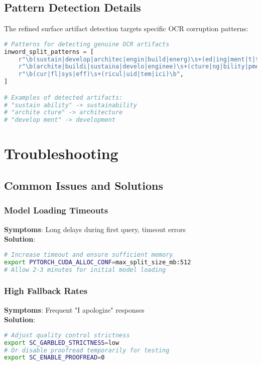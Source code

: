 \documentclass[12pt,a4paper]{article}
\begin{document}
\subsection{Pattern Detection Details}
The refined surface artifact detection targets specific OCR corruption patterns:

\begin{lstlisting}[language=python, caption=Surface artifact patterns]
# Patterns for detecting genuine OCR artifacts
inword_split_patterns = [
    r"\b(sustain|develop|architec|engin|build|energ)\s+(ed|ing|ment|t|ture|al|er|y)\b",
    r"\b(archite|buildi|sustaina|develo|enginee)\s+(cture|ng|bility|pment|ring)\b", 
    r"\b(cur|fl|sys|eff)\s+(ricul|uid|tem|ici)\b",
]

# Examples of detected artifacts:
# "sustain ability" -> sustainability
# "archite cture" -> architecture  
# "develop ment" -> development
\end{lstlisting}

\section{Troubleshooting}

\subsection{Common Issues and Solutions}

\subsubsection{Model Loading Timeouts}
\textbf{Symptoms}: Long delays during first query, timeout errors \\
\textbf{Solution}: 
\begin{lstlisting}[language=bash]
# Increase timeout and ensure sufficient memory
export PYTORCH_CUDA_ALLOC_CONF=max_split_size_mb:512
# Allow 2-3 minutes for initial model loading
\end{lstlisting}

\subsubsection{High Fallback Rates}
\textbf{Symptoms}: Frequent "I apologize" responses \\
\textbf{Solution}:
\begin{lstlisting}[language=bash]
# Adjust quality control strictness
export SC_GARBLED_STRICTNESS=low
# Or disable proofread temporarily for testing
export SC_ENABLE_PROOFREAD=0
\end{lstlisting}
\end{document}
